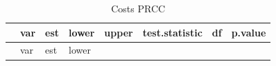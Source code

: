 \documentclass[
]{article}
\begin{document}
\begin{longtable}[]{@{}
  >{\raggedright\arraybackslash}p{}
  >{\raggedright\arraybackslash}p{}
  >{\raggedleft\arraybackslash}p{}
  >{\raggedleft\arraybackslash}p{}
  >{\raggedleft\arraybackslash}p{}
  >{\raggedleft\arraybackslash}p{}
  >{\raggedleft\arraybackslash}p{}
  >{\raggedleft\arraybackslash}p{}@{}}
\caption{Costs PRCC}\tabularnewline
\toprule\noalign{}
\begin{minipage}[b]{\linewidth}\raggedright
\end{minipage} & \begin{minipage}[b]{\linewidth}\raggedright
var
\end{minipage} & \begin{minipage}[b]{\linewidth}\raggedleft
est
\end{minipage} & \begin{minipage}[b]{\linewidth}\raggedleft
lower
\end{minipage} & \begin{minipage}[b]{\linewidth}\raggedleft
upper
\end{minipage} & \begin{minipage}[b]{\linewidth}\raggedleft
test.statistic
\end{minipage} & \begin{minipage}[b]{\linewidth}\raggedleft
df
\end{minipage} & \begin{minipage}[b]{\linewidth}\raggedleft
p.value
\end{minipage} \\
\midrule\noalign{}
\endfirsthead
\toprule\noalign{}
\begin{minipage}[b]{\linewidth}\raggedright
\end{minipage} & \begin{minipage}[b]{\linewidth}\raggedright
var
\end{minipage} & \begin{minipage}[b]{\linewidth}\raggedleft
est
\end{minipage} & \begin{minipage}[b]{\linewidth}\raggedleft
lower
\end{minipage} & \begin{minipage}[b]{\linewidth}\raggedleft

\end{minipage}
\end{longtable}
\end{document}
